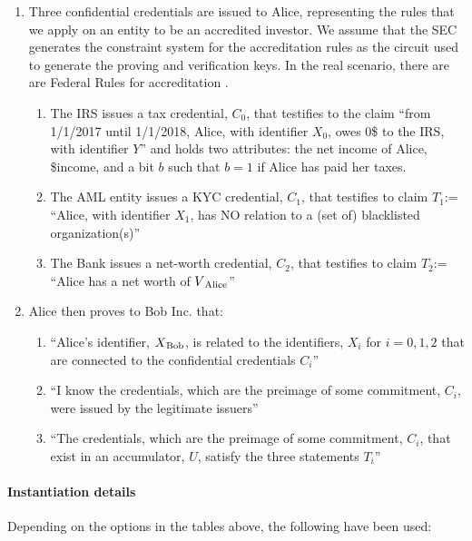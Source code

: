 \begin{enumerate}
\item Three confidential credentials are issued to Alice, representing the rules that we apply on an entity to be an accredited investor.
    We assume that the SEC generates the constraint system for the accreditation rules as the circuit used to generate the proving and verification keys. 
    In the real scenario, there are are Federal Rules for accreditation \cite{code-fed-regulations}.

    \begin{enumerate}
        \item The IRS issues a tax credential, $C_0$, that testifies to the claim ``from 1/1/2017 until 1/1/2018, Alice, with identifier $X_0$, owes 0\$ to the IRS, with identifier $Y$'' and holds two attributes: the net income of Alice, \$income, and a bit $b$ such that $b=1$ if Alice has paid her taxes.
        \item The AML entity issues a KYC credential, $C_1$, that testifies to claim $T_1$:= ``Alice, with identifier $X_1$, has NO relation to a (set of) blacklisted organization(s)''
        \item The Bank issues a net-worth credential, $C_2$, that testifies to claim $T_2$:= ``Alice has a net worth of $V\textsubscript{Alice}$''
	\end{enumerate}

\item Alice then proves to Bob Inc. that:
    \begin{enumerate}
		\item ``Alice's identifier, $X\textsubscript{Bob}$, is related to the identifiers, {$X_i$} for $i = 0, 1, 2$ that are connected to the confidential credentials {$C_i$}''
        \item ``I know the credentials, which are the preimage of some commitment, {$C_i$}, were issued by the legitimate issuers''
        \item ``The credentials, which are the preimage of some commitment, {$C_i$}, that exist in an accumulator, $U$, satisfy the three statements {$T_i$}''
	\end{enumerate}
\end{enumerate}


\paragraph{Instantiation details}
Depending on the options in the tables above, the following have been used:

